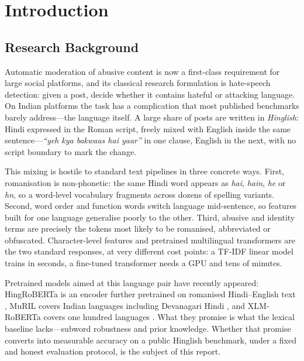 \chapter{Introduction}
\label{ch:intro}

\section{Research Background}
\label{sec:background}

Automatic moderation of abusive content is now a first-class requirement for
large social platforms, and its classical research formulation is hate-speech
detection: given a post, decide whether it contains hateful or attacking
language. On Indian platforms the task has a complication that most published
benchmarks barely address---the language itself. A large share of posts are
written in \emph{Hinglish}: Hindi expressed in the Roman script, freely mixed
with English inside the same sentence---\emph{``yeh kya bakwaas hai yaar''} in
one clause, English in the next, with no script boundary to mark the change.

This mixing is hostile to standard text pipelines in three concrete ways.
First, romanisation is non-phonetic: the same Hindi word appears as \emph{hai},
\emph{hain}, \emph{he} or \emph{hn}, so a word-level vocabulary fragments across
dozens of spelling variants. Second, word order and function words switch language
mid-sentence, so features built for one language generalise poorly to the other.
Third, abusive and identity terms are precisely the tokens most likely to be
romanised, abbreviated or obfuscated. Character-level features and pretrained
multilingual transformers are the two standard responses, at very different cost
points: a TF-IDF linear model trains in seconds, a fine-tuned transformer needs a
GPU and tens of minutes.

Pretrained models aimed at this language pair have recently appeared: HingRoBERTa
is an encoder further pretrained on romanised Hindi--English text
\cite{hingroberta,nayak2022}, MuRIL covers Indian languages including Devanagari
Hindi \cite{muril}, and XLM-RoBERTa covers one hundred languages \cite{xlmr}.
What they promise is what the lexical baseline lacks---subword robustness and
prior knowledge. Whether that promise converts into measurable accuracy on a
public Hinglish benchmark, under a fixed and honest evaluation protocol, is the
subject of this report.

